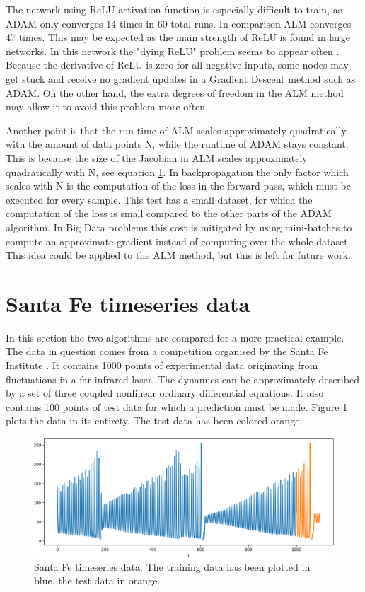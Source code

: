 The network using ReLU activation function is especially difficult to train, as ADAM only converges 14 times in 60 total runs. In comparison ALM converges 47 times. This may be expected as the main strength of ReLU is found in large networks. In this network the "dying ReLU" problem seems to appear often \cite{Lu2020}. Because the derivative of ReLU is zero for all negative inputs, some nodes may get stuck and receive no gradient updates in a Gradient Descent method such as ADAM. On the other hand, the extra degrees of freedom in the ALM method may allow it to avoid this problem more often.

Another point is that the run time of ALM scales approximately quadratically with the amount of data points N, while the runtime of ADAM stays constant. This is because the size of the Jacobian in ALM scales approximately quadratically with N, see equation \ref{}. In backpropagation the only factor which scales with N is the computation of the loss in the forward pass, which must be executed for every sample. This test has a small dataset, for which the computation of the loss is small compared to the other parts of the ADAM algorithm. In Big Data problems this cost is mitigated by using mini-batches to compute an approximate gradient instead of computing over the whole dataset. This idea could be applied to the ALM method, but this is left for future work.


\section{Santa Fe timeseries data}
In this section the two algorithms are compared for a more practical example. The data in question comes from a competition organised by the Santa Fe Institute \cite{weigend2018time}. It contains 1000 points of experimental data originating from fluctuations in a far-infrared laser. The dynamics can be approximately described by a set of three coupled nonlinear ordinary differential equations. It also contains 100 points of test data for which a prediction must be made. Figure \ref{santafedata} plots the data in its entirety. The test data has been colored orange.

\begin{figure}
   	\centering
	\includegraphics[width=\textwidth]{santafe}
	\caption{Santa Fe timeseries data. The training data has been plotted in blue, the test data in orange.}
	\label{santafedata}
\end{figure}

